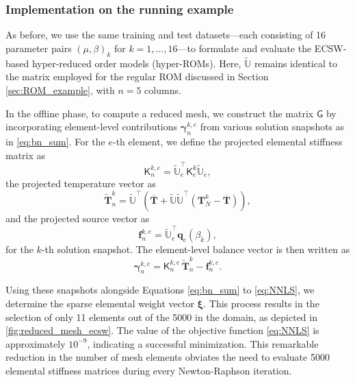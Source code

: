 \documentclass[11pt]{article}
\renewcommand{\vec}[1]{\mathbf{#1}}
\newcommand{\mat}[1]{\mathsf{#1}}
\begin{document}
\subsubsection*{Implementation on the running example}
As before, we use the same training and test datasets—each consisting of 16 parameter pairs \((\mu, \beta)_k\) for \(k=1, \ldots, 16\)—to formulate and evaluate the ECSW-based hyper-reduced order models (hyper-ROMs).
Here, \(\widetilde{\mathbb{U}}\) remains identical to the matrix employed for the regular ROM discussed in Section \ref{sec:ROM_example}, with \(n=5\) columns.


In the offline phase, to compute a reduced mesh, we construct the matrix $\mat{G}$ by incorporating element-level contributions $\boldsymbol{\gamma}^{k,e}_n$ from various solution snapshots as in \cref{eq:bn_sum}. 
For the $e$-th element, we define the projected elemental stiffness matrix as
\begin{equation}
    \mat{K}^{k,e}_n = \widetilde{\mathbb{U}}_e^{\top} \mat{K}^{k}_e \widetilde{\mathbb{U}}_e,
\end{equation}
the projected temperature vector as
\begin{equation}
    \widetilde{\vec{T}}^k_n = \widetilde{\mathbb{U}}^{\top} \left( \overline{\vec{T}} +  \widetilde{\mathbb{U}}\widetilde{\mathbb{U}}^{\top}\left(\vec{T}^{k}_N - \overline{\vec{T}}\right) \right),
    \label{eq:red_snapshot}
\end{equation}
and the projected source vector as
\begin{equation}
    \vec{f}^{k,e}_n = \widetilde{\mathbb{U}}_e^{\top} \vec{q}_e(\beta_k),
\end{equation}
for the $k$-th solution snapshot.
The element-level balance vector is then written as
\begin{equation}
    \boldsymbol{\gamma}^{k,e}_{n} = \mat{K}^{k,e}_n \,\widetilde{\vec{T}}^k_n - \vec{f}^{k,e}_n.
    \label{eq:gamma_n_exampleP}
\end{equation}


Using these snapshots alongside Equations \eqref{eq:bn_sum} to \eqref{eq:NNLS}, we determine the sparse elemental weight vector $\boldsymbol{\xi}$.
This process results in the selection of only 11 elements out of the 5000 in the domain, as depicted in \cref{fig:reduced_mesh_ecsw}.
The value of the objective function \cref{eq:NNLS} is approximately $10^{-9}$, indicating a successful minimization.
This remarkable reduction in the number of mesh elements obviates the need to evaluate 5000 elemental stiffness matrices during every Newton-Raphson iteration.
\end{document}
